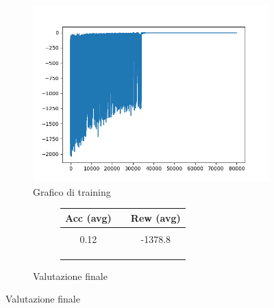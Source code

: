 \begin{figure}[H]
	\centering
	\begin{subfigure}[b]{.5\textwidth}
		\centering
		\includegraphics[width=\textwidth]{img/plot_80k_1000(2).png}
		\caption{Grafico di training}
	\end{subfigure}%
	\begin{subfigure}[b]{.5\textwidth}
		\centering
		\begin{figure}[H]
			\centering
			\begin{tabular}{c c c}
				\textbf{Acc (avg)}& \vline & \textbf{Rew (avg)}\\
				\hline
			    & \vline & \\ [.01em]
				0.12 & \vline & -1378.8 \\ [1.5em]
				& & \\ 
				&&  \\ 
				& & \\ 
			\end{tabular}
		\end{figure}
		\caption{Valutazione finale}
	\end{subfigure}%


\end{figure}
